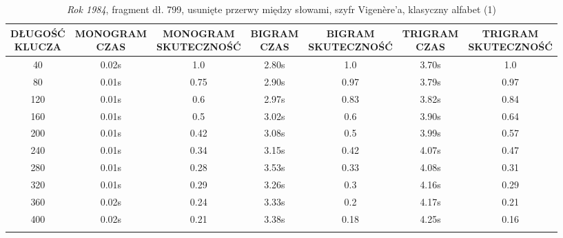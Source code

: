 \documentclass[a4paper]{article}
\theoremstyle{defn}
\theoremstyle{theorem}
\theoremstyle{lemma}
\theoremstyle{cor}
\theoremstyle{fact}
\begin{document}
\begin{center}\begin{small}\begin{longtable}{|c|c|c|c|c|c|c|} 
\hline \makecell{DŁUGOŚĆ\\KLUCZA} &  \makecell{MONOGRAM\\CZAS} & \makecell{MONOGRAM\\SKUTECZNOŚĆ} & \makecell{BIGRAM\\CZAS} &  \makecell{BIGRAM\\SKUTECZNOŚĆ} & \makecell{TRIGRAM\\CZAS} & \makecell{TRIGRAM\\SKUTECZNOŚĆ}\\ \hline 
40 & 0.02s & 1.0 & 2.80s & 1.0 & 3.70s & 1.0 \\ \hline 
80 & 0.01s & 0.75 & 2.90s & 0.97 & 3.79s & 0.97 \\ \hline 
120 & 0.01s & 0.6 & 2.97s & 0.83 & 3.82s & 0.84 \\ \hline 
160 & 0.01s & 0.5 & 3.02s & 0.6 & 3.90s & 0.64 \\ \hline 
200 & 0.01s & 0.42 & 3.08s & 0.5 & 3.99s & 0.57 \\ \hline 
240 & 0.01s & 0.34 & 3.15s & 0.42 & 4.07s & 0.47 \\ \hline 
280 & 0.01s & 0.28 & 3.53s & 0.33 & 4.08s & 0.31 \\ \hline 
320 & 0.01s & 0.29 & 3.26s & 0.3 & 4.16s & 0.29 \\ \hline 
360 & 0.02s & 0.24 & 3.33s & 0.2 & 4.17s & 0.21 \\ \hline 
400 & 0.02s & 0.21 & 3.38s & 0.18 & 4.25s & 0.16 \\ \hline 
\caption{\textit{Rok 1984}, fragment dł. 799, usunięte przerwy między słowami, szyfr Vigenère'a, klasyczny alfabet (1)}
\end{longtable}\end{small}\end{center} 
\end{document}
